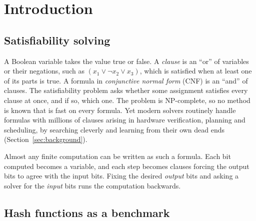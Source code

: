 \documentclass[11pt,a4paper]{article}
\begin{document}
\newpage

\section{Introduction}\label{sec:intro}

\subsection{Satisfiability solving}

A Boolean variable takes the value true or false. A \emph{clause} is an ``or'' of variables or their
negations, such as $(x_1 \vee \neg x_2 \vee x_3)$, which is satisfied when at least one of its parts
is true. A formula in \emph{conjunctive normal form} (CNF) is an ``and'' of clauses. The
satisfiability problem asks whether some assignment satisfies every clause at once, and if so, which
one. The problem is NP-complete, so no method is known that is fast on every formula. Yet modern
solvers routinely handle formulas with millions of clauses arising in hardware verification,
planning and scheduling, by searching cleverly and learning from their own dead ends
(Section~\ref{sec:background}).

Almost any finite computation can be written as such a formula. Each bit computed becomes a variable,
and each step becomes clauses forcing the output bits to agree with the input bits. Fixing the
desired \emph{output} bits and asking a solver for the \emph{input} bits runs the computation
backwards.

\subsection{Hash functions as a benchmark}
\end{document}
